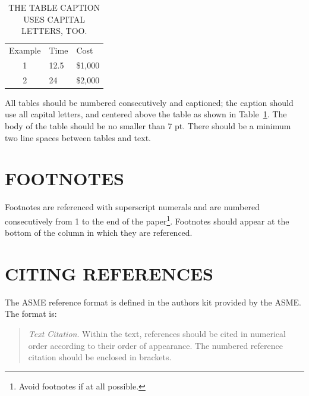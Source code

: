 \documentclass[twocolumn,10pt]{asme2e}
\begin{document}
\begin{table}[t]
\caption{THE TABLE CAPTION USES CAPITAL LETTERS, TOO.}
\begin{center}
\label{table_ASME}
\begin{tabular}{c l l}
& & \\ %
\hline
Example & Time & Cost \\
\hline
1 & 12.5 & \$1,000 \\
2 & 24 & \$2,000 \\
\hline
\end{tabular}
\end{center}
\end{table}

All tables should be numbered consecutively and  captioned; the caption should use all capital letters, and centered above the table as shown in Table~\ref{table_ASME}. The body of the table should be no smaller than 7 pt.  There should be a minimum two line spaces between tables and text.

\section*{FOOTNOTES\protect\footnotemark}

Footnotes are referenced with superscript numerals and are numbered consecutively from 1 to the end of the paper\footnote{Avoid footnotes if at all possible.}. Footnotes should appear at the bottom of the column in which they are referenced.


\section*{CITING REFERENCES}

The ASME reference format is defined in the authors kit provided by the ASME.  The format is:

\begin{quotation}
{\em Text Citation}. Within the text, references should be cited in  numerical order according to their order of appearance.  The numbered reference citation should be enclosed in brackets.
\end{quotation}
\end{document}

